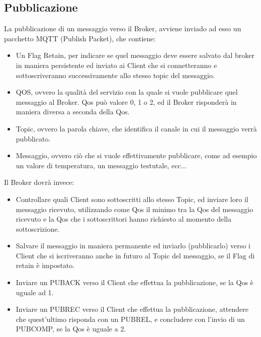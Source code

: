 \documentclass{article}
\begin{document}
\subsection{Pubblicazione}
La pubblicazione di un messaggio verso il Broker, avviene inviado ad esso un pacchetto MQTT (Publish Packet), che contiene:
\begin{itemize}
	\item Un Flag Retain, per indicare se quel messaggio deve essere salvato dal broker in maniera persistente ed inviato ai Client che si connetteranno e sottoscriveranno successivamente allo stesso topic del messaggio.
	\item QOS, ovvero la qualità del servizio con la quale si vuole pubblicare quel messaggio al Broker. Qos può valore 0, 1 o 2, ed il Broker risponderà in maniera diversa a seconda della Qos. 
	\item Topic, ovvero la parola chiave, che identifica il canale in cui il messaggio verrà pubblicato.
	\item Messaggio, ovvero ciò che si vuole effettivamente pubblicare, come ad esempio un valore di temperatura, un messaggio testutale, ecc...
\end{itemize}
Il Broker dovrà invece:
\begin{itemize}
	\item Controllare quali Client sono sottoscritti allo stesso Topic, ed inviare loro il messaggio ricevuto, utilizzando come Qos il minimo tra la Qos del messaggio ricevuto e la Qos che i sottoscrittori hanno richiesto al momento della sottoscrizione.
	\item Salvare il messaggio in maniera permanente ed inviarlo (pubblicarlo) verso i Client che si iscriveranno anche in futuro al Topic del messaggio, se il Flag di retain è impostato.
	\item Inviare un PUBACK verso il Client che effettua la pubblicazione, se la Qos è uguale ad 1.
	\item Inviare un PUBREC verso il Client che effettua la pubblicazione, attendere che quest'ultimo risponda con un PUBREL, e concludere con l'invio di un PUBCOMP, se la Qos è uguale a 2.
\end{itemize}
\end{document}
